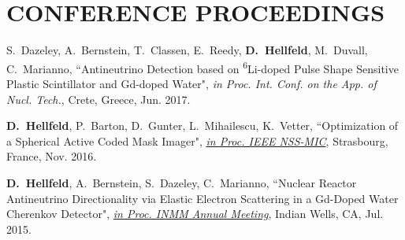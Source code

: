 \section{\small{CONFERENCE PROCEEDINGS}}

 \begin{thebibliography}{3}
 \raggedright
 \vspace{10pt}




  S.~Dazeley, A.~Bernstein, T.~Classen, E.~Reedy, \textbf{D.~Hellfeld}, M.~Duvall, C.~Marianno, ``Antineutrino Detection based on \textsuperscript{6}Li-doped Pulse Shape Sensitive Plastic Scintillator and Gd-doped Water", \emph{in Proc. Int. Conf. on the App. of Nucl. Tech.}, Crete, Greece, Jun. 2017. 
 
  \textbf{D.~Hellfeld}, P.~Barton, D.~Gunter, L.~Mihailescu, K.~Vetter, ``Optimization of a Spherical Active Coded Mask Imager", \href{http://ieeexplore.ieee.org/document/8069853/}{\emph{in Proc. IEEE NSS-MIC}}, Strasbourg, France, Nov. 2016. 
 
 
  \textbf{D.~Hellfeld}, A.~Bernstein, S.~Dazeley, C.~Marianno, ``Nuclear Reactor Antineutrino Directionality via Elastic Electron Scattering in a Gd-Doped Water Cherenkov Detector", \href{https://www.inmm.org/INMM-Resources/Proceedings-Presentations/Annual-Meeting-Proceedings}{\emph{in Proc. INMM Annual Meeting}}, Indian Wells, CA, Jul. 2015. 
 
 \end{thebibliography}

